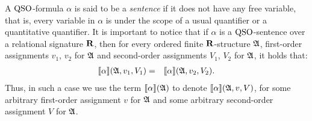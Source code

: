 A ${\rm QSO}$-formula $\alpha$ is said to be a \emph{sentence} if it does not have any free variable, that is, every variable in $\alpha$ is under the scope of a usual quantifier or a quantitative quantifier. It is important to notice that if $\alpha$ is a ${\rm QSO}$-sentence over a relational signature $\mathbf{R}$, then for every ordered finite $\mathbf{R}$-structure $\mathfrak{A}$, first-order assignments $v_1$, $v_2$ for $\mathfrak{A}$ and second-order assignments $V_1$, $V_2$ for $\mathfrak{A}$, it holds that:
\begin{eqnarray*}
	{\llbracket{}{\alpha}\rrbracket}(\mathfrak{A}, v_1, V_1) & = & {\llbracket{}{\alpha}\rrbracket}(\mathfrak{A}, v_2, V_2).
\end{eqnarray*}
Thus, in such a case we use the term ${\llbracket{}{\alpha}\rrbracket}(\mathfrak{A})$ to denote ${\llbracket{}{\alpha}\rrbracket}(\mathfrak{A}, v, V)$, for some arbitrary first-order assignment $v$ for $\mathfrak{A}$ and some arbitrary second-order assignment $V$ for $\mathfrak{A}$. 
